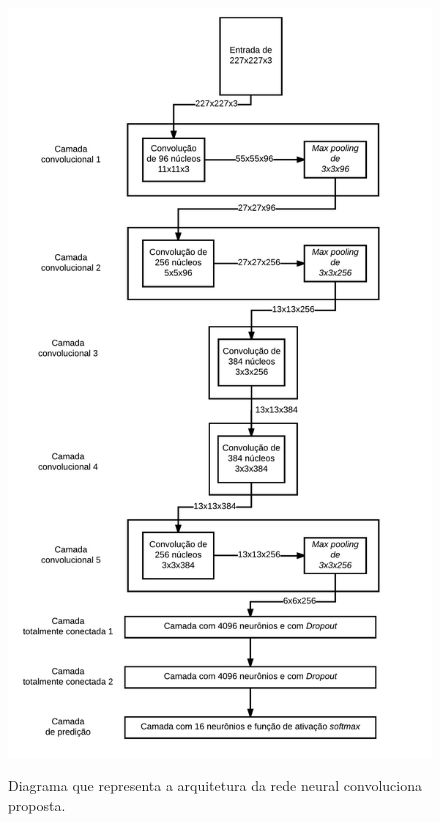 \begin{figure}[H]
  \centering
  \caption{Diagrama que representa a arquitetura da rede neural convoluciona proposta.}
  \includegraphics[width=500pt,angle=90]{dados/figuras/dia_rede}
  \label{fig:arqrede}
\end{figure}

